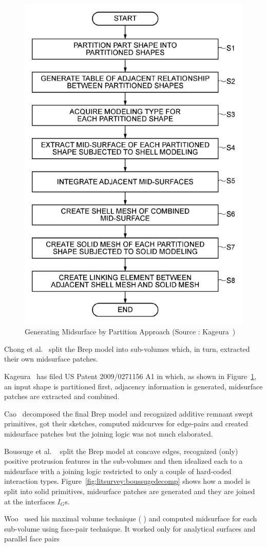 \begin{figure}[!h]
\centering     %
\includegraphics[width=0.45\linewidth,valign=t]{../Common/images/Kageura}
\caption{Generating Midsurface by Partition Approach (Source : Kageura~\cite{Kageura2009})}
\label{fig:litsurvey:Kageura}
\end{figure}


Chong et al.~\cite{Chong2004} split the Brep model into sub-volumes which, in turn, extracted their own midsurface patches.

Kageura~\cite{Kageura2009} has filed US Patent 2009/0271156 A1 in which, as shown in Figure~\ref{fig:litsurvey:Kageura},  an input shape is partitioned first, adjacency information is generated, midsurface patches are extracted and combined.

Cao~\cite{Cao2009, Cao2011} decomposed the final Brep model and recognized additive remnant swept primitives, got their sketches, computed midcurves for edge-pairs and created midsurface patches but the joining logic was not much elaborated. 

Boussuge et al. ~\cite{Boussuge2013,Boussuge2013a}  split the Brep model at concave edges, recognized (only) positive  protrusion features in the sub-volumes and then idealized each to a midsurface with a joining logic restricted to only a couple of hard-coded interaction types. Figure~\ref{fig:litsurvey:boussugedecomp} shows how a model is split into solid primitives, midsurface patches are generated and they are joined at the interfaces $I_G$s.

Woo~\cite{Woo2013} used his maximal volume technique (\cite{Woo2006, Woo2009} ) and computed midsurface for each sub-volume using face-pair technique. It worked only for analytical surfaces and parallel face pairs


